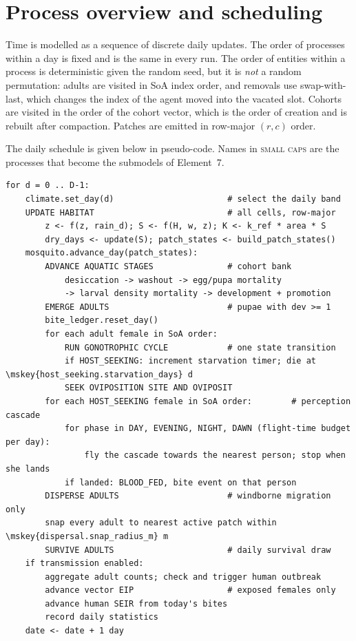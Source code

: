 \documentclass[11pt,a4paper]{article}
\begin{document}
\section{Process overview and scheduling}

Time is modelled as a sequence of discrete daily updates. The order of
processes within a day is fixed and is the same in every run. The order
of entities within a process is deterministic given the random seed, but
it is \emph{not} a random permutation: adults are visited in SoA index
order, and removals use swap-with-last, which changes the index of the
agent moved into the vacated slot. Cohorts are visited in the order of
the cohort vector, which is the order of creation and is rebuilt after
compaction. Patches are emitted in row-major $(r,c)$ order.

The daily schedule is given below in pseudo-code. Names in
\textsc{small caps} are the processes that become the submodels of
Element~7.

\begin{lstlisting}
for d = 0 .. D-1:
    climate.set_day(d)                       # select the daily band
    UPDATE HABITAT                           # all cells, row-major
        z <- f(z, rain_d); S <- f(H, w, z); K <- k_ref * area * S
        dry_days <- update(S); patch_states <- build_patch_states()
    mosquito.advance_day(patch_states):
        ADVANCE AQUATIC STAGES               # cohort bank
            desiccation -> washout -> egg/pupa mortality
            -> larval density mortality -> development + promotion
        EMERGE ADULTS                        # pupae with dev >= 1
        bite_ledger.reset_day()
        for each adult female in SoA order:
            RUN GONOTROPHIC CYCLE            # one state transition
            if HOST_SEEKING: increment starvation timer; die at \mskey{host_seeking.starvation_days} d
            SEEK OVIPOSITION SITE AND OVIPOSIT
        for each HOST_SEEKING female in SoA order:        # perception cascade
            for phase in DAY, EVENING, NIGHT, DAWN (flight-time budget per day):
                fly the cascade towards the nearest person; stop when she lands
            if landed: BLOOD_FED, bite event on that person
        DISPERSE ADULTS                      # windborne migration only
        snap every adult to nearest active patch within \mskey{dispersal.snap_radius_m} m
        SURVIVE ADULTS                       # daily survival draw
    if transmission enabled:
        aggregate adult counts; check and trigger human outbreak
        advance vector EIP                   # exposed females only
        advance human SEIR from today's bites
        record daily statistics
    date <- date + 1 day
\end{lstlisting}
\end{document}
